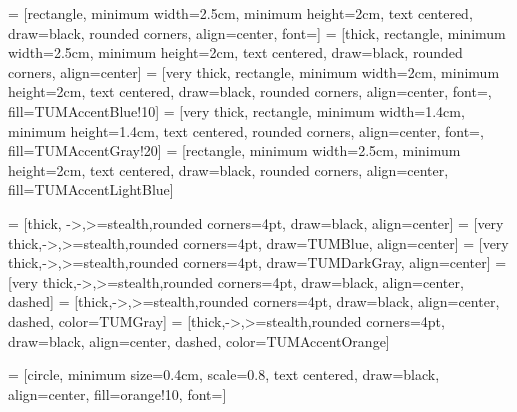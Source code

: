  = [rectangle, minimum width=2.5cm, minimum height=2cm, text centered, draw=black, rounded corners, align=center, font=\fontsize{16}{22}\selectfont]
 = [thick, rectangle, minimum width=2.5cm, minimum height=2cm, text centered, draw=black, rounded corners, align=center]
 = [very thick, rectangle, minimum width=2cm, minimum height=2cm, text centered, draw=black, rounded corners, align=center, font=\fontsize{16}{0}\selectfont, fill=TUMAccentBlue!10]
 = [very thick, rectangle, minimum width=1.4cm, minimum height=1.4cm, text centered, rounded corners, align=center, font=\fontsize{16}{0}\selectfont, fill=TUMAccentGray!20]
 = [rectangle, minimum width=2.5cm, minimum height=2cm, text centered, draw=black, rounded corners, align=center, fill=TUMAccentLightBlue]


 = [thick, ->,>=stealth,rounded corners=4pt, draw=black, align=center]
 = [very thick,->,>=stealth,rounded corners=4pt, draw=TUMBlue, align=center]
 = [very thick,->,>=stealth,rounded corners=4pt, draw=TUMDarkGray, align=center]
 = [very thick,->,>=stealth,rounded corners=4pt, draw=black, align=center, dashed]
 = [thick,->,>=stealth,rounded corners=4pt, draw=black, align=center, dashed, color=TUMGray]
 = [thick,->,>=stealth,rounded corners=4pt, draw=black, align=center, dashed, color=TUMAccentOrange]

 = [circle, minimum size=0.4cm, scale=0.8, text centered, draw=black, align=center, fill=orange!10, font=\large]


